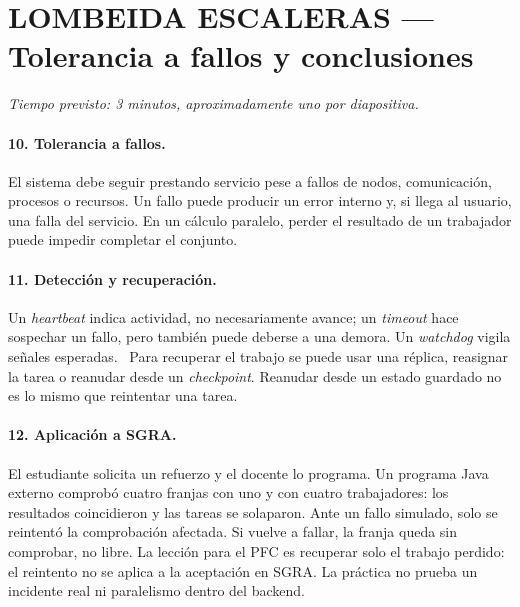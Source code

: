 \section*{LOMBEIDA ESCALERAS — Tolerancia a fallos y conclusiones}

\noindent\textit{Tiempo previsto: 3 minutos, aproximadamente uno por diapositiva.}

\paragraph{10. Tolerancia a fallos.}
El sistema debe seguir prestando servicio pese a fallos de nodos, comunicación, procesos o recursos. Un fallo puede producir un error interno y, si llega al usuario, una falla del servicio. En un cálculo paralelo, perder el resultado de un trabajador puede impedir completar el conjunto.~\cite{assiri2025,mushtaq2024}

\paragraph{11. Detección y recuperación.}
Un \emph{heartbeat} indica actividad, no necesariamente avance; un \emph{timeout} hace sospechar un fallo, pero también puede deberse a una demora. Un \emph{watchdog} vigila señales esperadas.~\cite{chaurasia2024,asch2025}
Para recuperar el trabajo se puede usar una réplica, reasignar la tarea o reanudar desde un \emph{checkpoint}. Reanudar desde un estado guardado no es lo mismo que reintentar una tarea.~\cite{mushtaq2024}

\paragraph{12. Aplicación a SGRA.}
El estudiante solicita un refuerzo y el docente lo programa. Un programa Java externo comprobó cuatro franjas con uno y con cuatro trabajadores: los resultados coincidieron y las tareas se solaparon. Ante un fallo simulado, solo se reintentó la comprobación afectada. Si vuelve a fallar, la franja queda sin comprobar, no libre. La lección para el PFC es recuperar solo el trabajo perdido: el reintento no se aplica a la aceptación en SGRA. La práctica no prueba un incidente real ni paralelismo dentro del backend.

